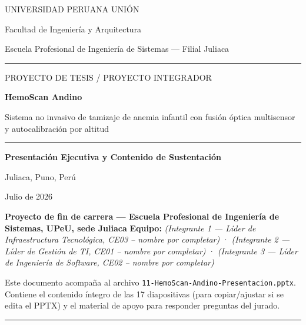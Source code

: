 \documentclass[11pt,a4paper]{article}
\begin{document}
\begin{titlepage}
\centering
\vspace*{1.2cm}
{\large UNIVERSIDAD PERUANA UNI\'ON\par}
{\normalsize Facultad de Ingenier\'ia y Arquitectura\par}
{\normalsize Escuela Profesional de Ingenier\'ia de Sistemas --- Filial Juliaca\par}
\vspace{0.5cm}
\rule{0.6\linewidth}{0.4pt}
\vspace{1.6cm}

{\large PROYECTO DE TESIS / PROYECTO INTEGRADOR\par}
\vspace{1.0cm}
{\huge\bfseries HemoScan Andino\par}
\vspace{0.6cm}
{\Large Sistema no invasivo de tamizaje de anemia infantil con fusi\'on \'optica multisensor y autocalibraci\'on por altitud\par}
\vspace{1.6cm}
\rule{0.6\linewidth}{0.4pt}
\vspace{1.6cm}

{\Large\bfseries Presentaci\'on Ejecutiva y Contenido de Sustentaci\'on\par}
\vspace{2.0cm}

{\normalsize Juliaca, Puno, Per\'u \par}
{\normalsize Julio de 2026\par}

\vfill
\end{titlepage}

\tableofcontents
\newpage

\textbf{Proyecto de fin de carrera --- Escuela Profesional de Ingeniería de Sistemas, UPeU, sede Juliaca}
\textbf{Equipo:} \textit{(Integrante 1 --- Líder de Infraestructura Tecnológica, CE03 -- nombre por completar)} · \textit{(Integrante 2 --- Líder de Gestión de TI, CE01 -- nombre por completar)} · \textit{(Integrante 3 --- Líder de Ingeniería de Software, CE02 -- nombre por completar)}

Este documento acompaña al archivo \texttt{11-HemoScan-Andino-Presentacion.pptx}. Contiene el contenido íntegro de las 17 diapositivas (para copiar/ajustar si se edita el PPTX) y el material de apoyo para responder preguntas del jurado.

\begin{center}\rule{0.5\linewidth}{0.5pt}\end{center}
\end{document}
